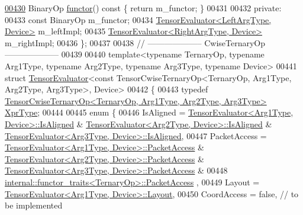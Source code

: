 \begin{DoxyCode}
\hyperlink{struct_eigen_1_1_tensor_evaluator_3_01const_01_tensor_cwise_binary_op_3_01_binary_op_00_01_left_d0674d2fbf9b5f3fd40347d3eda7a38d_a2918eff26a6ece37e4a53bc8d3fdbb55}{00430}   BinaryOp \hyperlink{struct_eigen_1_1_tensor_evaluator_3_01const_01_tensor_cwise_binary_op_3_01_binary_op_00_01_left_d0674d2fbf9b5f3fd40347d3eda7a38d_a2918eff26a6ece37e4a53bc8d3fdbb55}{functor}()\textcolor{keyword}{ const }\{ \textcolor{keywordflow}{return} m\_functor; \}
00431 
00432  \textcolor{keyword}{private}:
00433   \textcolor{keyword}{const} BinaryOp m\_functor;
00434   \hyperlink{struct_eigen_1_1_tensor_evaluator}{TensorEvaluator<LeftArgType, Device>} m\_leftImpl;
00435   \hyperlink{struct_eigen_1_1_tensor_evaluator}{TensorEvaluator<RightArgType, Device>} m\_rightImpl;
00436 \};
00437 
00438 \textcolor{comment}{// -------------------- CwiseTernaryOp --------------------}
00439 
00440 \textcolor{keyword}{template}<\textcolor{keyword}{typename} TernaryOp, \textcolor{keyword}{typename} Arg1Type, \textcolor{keyword}{typename} Arg2Type, \textcolor{keyword}{typename} Arg3Type, \textcolor{keyword}{typename} Device>
00441 \textcolor{keyword}{struct }\hyperlink{struct_eigen_1_1_tensor_evaluator}{TensorEvaluator}<const TensorCwiseTernaryOp<TernaryOp, Arg1Type, Arg2Type, Arg3Type>, 
      Device>
00442 \{
00443   \textcolor{keyword}{typedef} \hyperlink{class_eigen_1_1_tensor_cwise_ternary_op}{TensorCwiseTernaryOp<TernaryOp, Arg1Type, Arg2Type, Arg3Type>}
       \hyperlink{class_eigen_1_1_tensor_cwise_binary_op}{XprType};
00444 
00445   \textcolor{keyword}{enum} \{
00446     IsAligned = \hyperlink{struct_eigen_1_1_tensor_evaluator}{TensorEvaluator<Arg1Type, Device>::IsAligned} & 
      \hyperlink{struct_eigen_1_1_tensor_evaluator}{TensorEvaluator<Arg2Type, Device>::IsAligned} & 
      \hyperlink{struct_eigen_1_1_tensor_evaluator}{TensorEvaluator<Arg3Type, Device>::IsAligned},
00447     PacketAccess = \hyperlink{struct_eigen_1_1_tensor_evaluator}{TensorEvaluator<Arg1Type, Device>::PacketAccess}
       & \hyperlink{struct_eigen_1_1_tensor_evaluator}{TensorEvaluator<Arg2Type, Device>::PacketAccess} & 
      \hyperlink{struct_eigen_1_1_tensor_evaluator}{TensorEvaluator<Arg3Type, Device>::PacketAccess} &
00448                    \hyperlink{struct_eigen_1_1internal_1_1functor__traits}{internal::functor\_traits<TernaryOp>::PacketAccess}
      ,
00449     Layout = \hyperlink{struct_eigen_1_1_tensor_evaluator}{TensorEvaluator<Arg1Type, Device>::Layout},
00450     CoordAccess = \textcolor{keyword}{false},  \textcolor{comment}{// to be implemented}

\end{DoxyCode}
